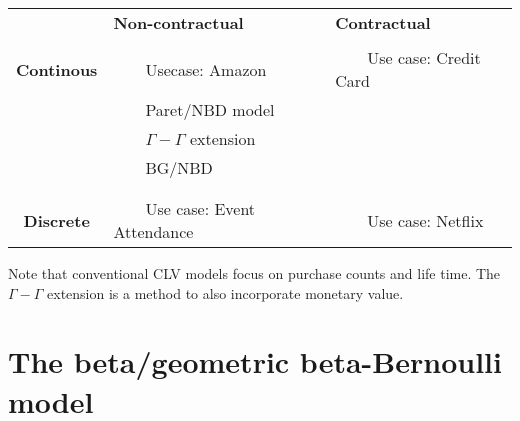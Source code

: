 \documentclass[10pt,a4paper]{article}
\newcommand{\tabitem}{~~\llap{\textbullet}~~}
\begin{document}
\begin{center}
  \begin{tabular}{  c   l   l }
    \hline
    & \textbf{Non-contractual} & \textbf{Contractual}\\ %
    \\
    \textbf{Continous}  & \tabitem Usecase: Amazon & \tabitem Use case: Credit Card \\  
                        & \tabitem Paret/NBD model \cite{schmittlein_1987} & \\
                        & \tabitem $\Gamma-\Gamma$ extension \cite{fader_gamma_gamma, fader_rfm_clv_2005}  &  \\
                        & \tabitem BG/NBD \cite{Fader_2010_excel} & \\
                        
    \\
    \\
    \textbf{Discrete} & \tabitem Use case: Event Attendance & \tabitem Use case: Netflix \\
    \hline
  \end{tabular}
\end{center}

Note that conventional CLV models \cite{schmittlein_1987} focus on purchase counts and life time. The $\Gamma-\Gamma$ extension \cite{fader_rfm_clv_2005} is a method to also incorporate monetary value. 

\section{The beta/geometric beta-Bernoulli model}
\cite{Fader_2010_excel}



\end{document}
